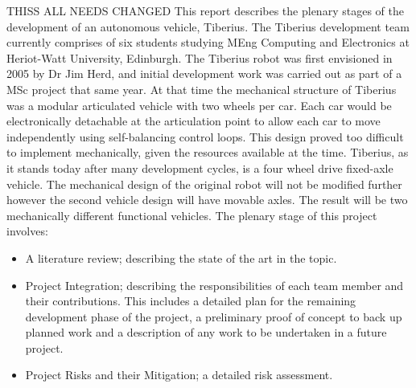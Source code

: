 THISS ALL NEEDS CHANGED
\newline
This report describes the plenary stages of the development of an autonomous vehicle, Tiberius. The Tiberius development team currently comprises of six students studying MEng Computing and Electronics at Heriot-Watt University, Edinburgh.
\newline
The Tiberius robot was first envisioned in 2005 by Dr Jim Herd, and initial development work was carried out as part of a MSc project that same year. At that time the mechanical structure of Tiberius was a modular articulated vehicle with two wheels per car. Each car would be electronically detachable at the articulation point to allow each car to move independently using self-balancing control loops. This design proved too difficult to implement mechanically, given the resources available at the time.
\newline
Tiberius, as it stands today after many development cycles, is a four wheel drive fixed-axle vehicle. The mechanical design of the original robot will not be modified further however the second vehicle design will have movable axles.  The result will be two mechanically different functional vehicles.
\newline
The plenary stage of this project involves:
\begin{itemize}
\item A literature review; describing the state of the art in the topic.
\item Project Integration; describing the responsibilities of each team member and their contributions.  This includes a detailed plan for the remaining development phase of the project, a preliminary proof of concept to back up planned work and a description of any work to be undertaken in a future project.
\item Project Risks and their Mitigation; a detailed risk assessment.
\end{itemize}
\pagebreak
